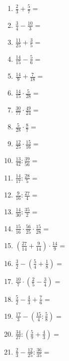 \newpage
\begin{Exercise}[title={Berechne die folgenden Ausdrücke und kürze soweit wie möglich}, label=bruecheA1]

	\begin{minipage}{\textwidth}
		\begin{minipage}{0.5\textwidth}
			\begin{enumerate}[label=\alph*)]
				\item \(\frac{2}{3}+\frac{5}{7}=\)
				\item \(\frac{3}{4}-\frac{10}{3}=\)
				\item \(\frac{11}{25}+\frac{3}{5}=\)
				\item \(\frac{14}{15}-\frac{5}{6}=\)
				\item \(\frac{14}{9}+\frac{7}{18}=\)
				\item \(\frac{14}{15}\cdot\frac{5}{28}=\)
				\item \(\frac{30}{77}\cdot\frac{49}{24}=\)
				\item \(\frac{5}{28}\cdot\frac{8}{7}=\)
				\item \(\frac{12}{25}\cdot\frac{15}{16}=\)
				\item \(\frac{13}{42}:\frac{39}{56}=\)
				\item \(\frac{14}{17}:\frac{28}{5}=\)
				\item \(\frac{9}{16}:\frac{27}{4}=\)
				\item \(\frac{14}{30}:\frac{35}{2}=\)
			\end{enumerate}
		\end{minipage}%
		\begin{minipage}{0.5\textwidth}
			\begin{enumerate}[label=\alph*)]
				\setcounter{enumi}{13}
				\item \(\frac{15}{16}\cdot\frac{56}{25}\cdot\frac{15}{28}=\)
				\item \(\left( \frac{27}{14}+\frac{9}{14}\right) \cdot \frac{14}{9}=\)
				\item \(\frac{3}{2}-\left( \frac{5}{4}+\frac{1}{8}\right) =\)
				\item \(\frac{10}{7}\cdot\left( \frac{2}{5}-\frac{3}{4}\right) =\)
				\item \(\frac{5}{2}-\frac{4}{3}+\frac{7}{6}=\)
				\item \(\frac{17}{3}-\left( \frac{15}{4}:\frac{5}{8}\right) =\)
				\item \(\frac{34}{27}:\left( \frac{5}{9}+\frac{4}{3}\right) =\)
				\item \(\frac{2}{3}-\frac{12}{25}:\frac{36}{35}=\)

\end{enumerate}
\end{minipage}
\end{minipage}
\end{Exercise}
